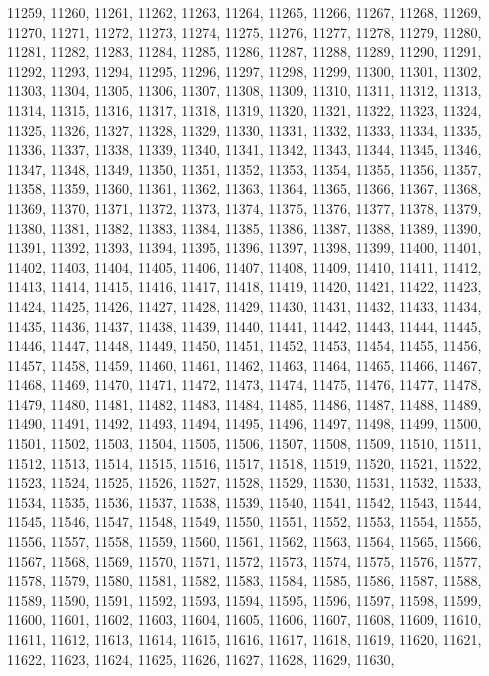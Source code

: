 11259,
11260,
11261,
11262,
11263,
11264,
11265,
11266,
11267,
11268,
11269,
11270,
11271,
11272,
11273,
11274,
11275,
11276,
11277,
11278,
11279,
11280,
11281,
11282,
11283,
11284,
11285,
11286,
11287,
11288,
11289,
11290,
11291,
11292,
11293,
11294,
11295,
11296,
11297,
11298,
11299,
11300,
11301,
11302,
11303,
11304,
11305,
11306,
11307,
11308,
11309,
11310,
11311,
11312,
11313,
11314,
11315,
11316,
11317,
11318,
11319,
11320,
11321,
11322,
11323,
11324,
11325,
11326,
11327,
11328,
11329,
11330,
11331,
11332,
11333,
11334,
11335,
11336,
11337,
11338,
11339,
11340,
11341,
11342,
11343,
11344,
11345,
11346,
11347,
11348,
11349,
11350,
11351,
11352,
11353,
11354,
11355,
11356,
11357,
11358,
11359,
11360,
11361,
11362,
11363,
11364,
11365,
11366,
11367,
11368,
11369,
11370,
11371,
11372,
11373,
11374,
11375,
11376,
11377,
11378,
11379,
11380,
11381,
11382,
11383,
11384,
11385,
11386,
11387,
11388,
11389,
11390,
11391,
11392,
11393,
11394,
11395,
11396,
11397,
11398,
11399,
11400,
11401,
11402,
11403,
11404,
11405,
11406,
11407,
11408,
11409,
11410,
11411,
11412,
11413,
11414,
11415,
11416,
11417,
11418,
11419,
11420,
11421,
11422,
11423,
11424,
11425,
11426,
11427,
11428,
11429,
11430,
11431,
11432,
11433,
11434,
11435,
11436,
11437,
11438,
11439,
11440,
11441,
11442,
11443,
11444,
11445,
11446,
11447,
11448,
11449,
11450,
11451,
11452,
11453,
11454,
11455,
11456,
11457,
11458,
11459,
11460,
11461,
11462,
11463,
11464,
11465,
11466,
11467,
11468,
11469,
11470,
11471,
11472,
11473,
11474,
11475,
11476,
11477,
11478,
11479,
11480,
11481,
11482,
11483,
11484,
11485,
11486,
11487,
11488,
11489,
11490,
11491,
11492,
11493,
11494,
11495,
11496,
11497,
11498,
11499,
11500,
11501,
11502,
11503,
11504,
11505,
11506,
11507,
11508,
11509,
11510,
11511,
11512,
11513,
11514,
11515,
11516,
11517,
11518,
11519,
11520,
11521,
11522,
11523,
11524,
11525,
11526,
11527,
11528,
11529,
11530,
11531,
11532,
11533,
11534,
11535,
11536,
11537,
11538,
11539,
11540,
11541,
11542,
11543,
11544,
11545,
11546,
11547,
11548,
11549,
11550,
11551,
11552,
11553,
11554,
11555,
11556,
11557,
11558,
11559,
11560,
11561,
11562,
11563,
11564,
11565,
11566,
11567,
11568,
11569,
11570,
11571,
11572,
11573,
11574,
11575,
11576,
11577,
11578,
11579,
11580,
11581,
11582,
11583,
11584,
11585,
11586,
11587,
11588,
11589,
11590,
11591,
11592,
11593,
11594,
11595,
11596,
11597,
11598,
11599,
11600,
11601,
11602,
11603,
11604,
11605,
11606,
11607,
11608,
11609,
11610,
11611,
11612,
11613,
11614,
11615,
11616,
11617,
11618,
11619,
11620,
11621,
11622,
11623,
11624,
11625,
11626,
11627,
11628,
11629,
11630,
